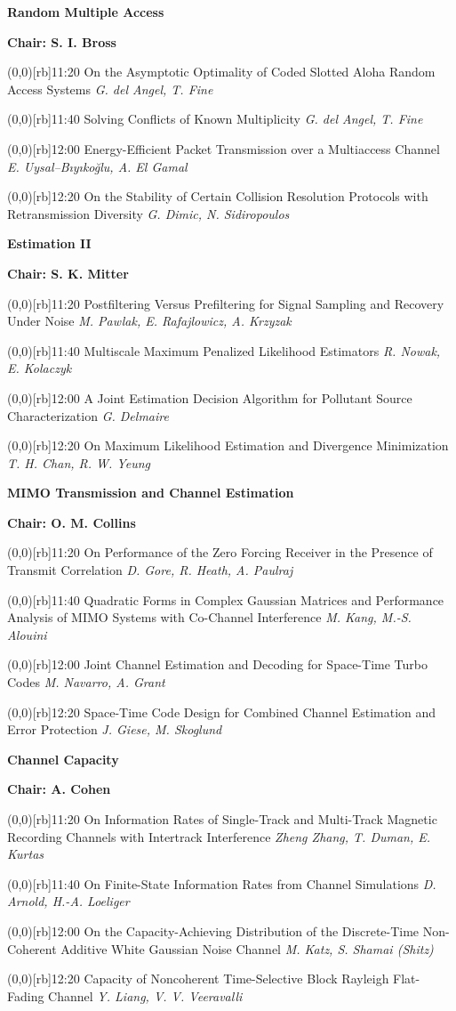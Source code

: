 \documentclass[a5paper,twoside]{article}
\def\sesstitle#1{\vspace{.45\bigskipamount}\par{\bfseries #1}\par}
\def\sesschair#1{{\bfseries Chair: #1}\par\vspace{.65\medskipamount}}
\def\papertime#1{\makebox(0,0)[rb]{{\scriptsize #1}\hspace{.5em}}}
\def\papertitle#1{#1\hfil\break}
\def\paperauthors#1{{\itshape #1}\par\filbreak\vspace{.65\medskipamount}}
\begin{document}
\sesstitle{Random Multiple Access}
\sesschair{S. I. Bross}
\papertime{11:20}%
\papertitle{On the Asymptotic Optimality of Coded Slotted Aloha Random Access Systems}
\paperauthors{G. del Angel, T. Fine}
\papertime{11:40}%
\papertitle{Solving Conflicts of Known Multiplicity}
\paperauthors{G. del Angel, T. Fine}
\papertime{12:00}%
\papertitle{Energy-Efficient Packet Transmission over a Multiaccess Channel}
\paperauthors{E. Uysal--B{\i}y{\i}ko\u{g}lu, A. El Gamal}
\papertime{12:20}%
\papertitle{On the Stability of Certain Collision Resolution Protocols with Retransmission Diversity}
\paperauthors{G. Dimic, N. Sidiropoulos}
\sesstitle{Estimation II}
\sesschair{S. K. Mitter}
\papertime{11:20}%
\papertitle{Postfiltering Versus Prefiltering for Signal Sampling and Recovery Under Noise}
\paperauthors{M. Pawlak, E. Rafajlowicz, A. Krzyzak}
\papertime{11:40}%
\papertitle{Multiscale Maximum Penalized Likelihood Estimators}
\paperauthors{R. Nowak, E. Kolaczyk}
\papertime{12:00}%
\papertitle{A Joint Estimation Decision Algorithm for Pollutant Source Characterization}
\paperauthors{G. Delmaire}
\papertime{12:20}%
\papertitle{On Maximum Likelihood Estimation and Divergence Minimization}
\paperauthors{T. H. Chan, R. W. Yeung}
\sesstitle{MIMO Transmission and Channel Estimation}
\sesschair{O. M. Collins}
\papertime{11:20}%
\papertitle{On Performance of the Zero Forcing Receiver in the Presence of Transmit Correlation}
\paperauthors{D. Gore, R. Heath, A. Paulraj}
\papertime{11:40}%
\papertitle{Quadratic Forms in Complex Gaussian Matrices and Performance Analysis of MIMO Systems with Co-Channel Interference}
\paperauthors{M. Kang, M.-S. Alouini}
\papertime{12:00}%
\papertitle{Joint Channel Estimation and Decoding for Space-Time Turbo Codes}
\paperauthors{M. Navarro, A. Grant}
\papertime{12:20}%
\papertitle{Space-Time Code Design for Combined Channel Estimation and Error Protection}
\paperauthors{J. Giese, M. Skoglund}
\sesstitle{Channel Capacity}
\sesschair{A. Cohen}
\papertime{11:20}%
\papertitle{On Information Rates of Single-Track and Multi-Track Magnetic Recording Channels with Intertrack Interference}
\paperauthors{Zheng Zhang, T. Duman, E. Kurtas}
\papertime{11:40}%
\papertitle{On Finite-State Information Rates from Channel Simulations}
\paperauthors{D. Arnold, H.-A. Loeliger}
\papertime{12:00}%
\papertitle{On the Capacity-Achieving Distribution of the Discrete-Time Non-Coherent Additive White Gaussian Noise Channel}
\paperauthors{M. Katz, S. Shamai (Shitz)}
\papertime{12:20}%
\papertitle{Capacity of Noncoherent Time-Selective Block Rayleigh Flat-Fading Channel}
\paperauthors{Y. Liang, V. V. Veeravalli}
\end{document}
